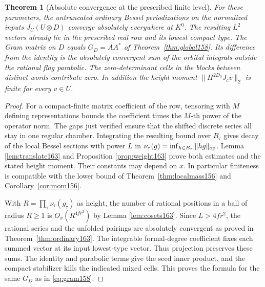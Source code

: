 \documentclass[a4paper,11pt]{article}
\newtheorem{theorem}[proposition]{Theorem}
\theoremstyle{definition}
\theoremstyle{remark}
\numberwithin{equation}{section}
\begin{document}
\begin{theorem}[Absolute convergence at the prescribed finite level]
\label{thm:ordinary164}
For these parameters, the untruncated ordinary Bessel
periodizations on the normalized inputs \(J_U(U\otimes D)\)
converge absolutely everywhere at \(K^0\). The resulting
\(L^2\) vectors already lie in the prescribed real row and its
lowest compact type. The Gram matrix on \(D\) equals
\(G_D=AA^*\) of Theorem~\ref{thm:global158}. Its difference
from the identity is the absolutely convergent sum of the
orbital integrals outside the rational flag parabolic. The
zero-determinant cells in the blocks between distinct words
contribute zero. In addition the height moment
\(\|H^{2D_0}J_c v\|_2\) is finite for every \(v\in U\).
\end{theorem}
\begin{proof}
For a compact-finite matrix coefficient of the row, tensoring
with \(M\) defining representations bounds the coefficient
times the \(M\)-th power of the operator norm. The gaps just
verified ensure that the shifted discrete series all stay in
one regular chamber. Integrating the resulting bound over
\(B_\tau\) gives decay of the local Bessel sections with power
\(L\) in \(\nu_\tau(g)=\inf_{h\in B_\tau}\|hg\|_{\rm op}\).
Lemma \ref{lem:translate163} and Proposition \ref{prop:weight163}
prove both estimates and the stated height moment. Their
constants may depend on \(x\). In particular finiteness is
compatible with the lower bound of Theorem~\ref{thm:localmass156}
and Corollary~\ref{cor:mom156}.

With \(R=\prod_\tau\nu_\tau(g_\tau)\) as height, the number
of rational positions in a ball of radius \(R\ge1\) is
\(O_x(R^{4fr^2})\) by Lemma \ref{lem:cosets163}. Since
\(L>4fr^2\), the rational series and the unfolded pairings
are absolutely convergent as proved in Theorem~\ref{thm:ordinary163}.
The integrable formal-degree coefficient fixes each summed
vector at its input lowest-type vector. Thus projection
preserves these sums. The identity and parabolic terms give
the seed inner product, and the compact stabilizer kills the
indicated mixed cells. This proves the formula for the same
\(G_D\) as in \eqref{eq:gram158}.
\end{proof}
\end{document}
